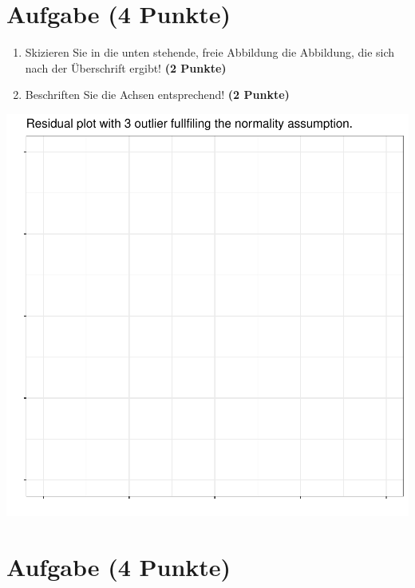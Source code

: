 \documentclass[a4paper, 10pt]{scrartcl}\usepackage[]{graphicx}\usepackage[]{xcolor}
\makeatletter
\def\maxwidth{ %
  \ifdim\Gin@nat@width>\linewidth
    \linewidth
  \else
    \Gin@nat@width
  \fi
}
\makeatother
\begin{document}
 
\clearpage

\section{Aufgabe \hfill (4 Punkte)}



\begin{enumerate}
\item Skizieren Sie in die unten stehende, freie Abbildung die
  Abbildung, die sich nach der {\"U}berschrift ergibt! \textbf{(2 Punkte)}
\item Beschriften Sie die Achsen entsprechend! \textbf{(2 Punkte)}
\end{enumerate}



{\centering \includegraphics[width=\maxwidth]{img/regression-03-1} 

}



 
\clearpage

\section{Aufgabe \hfill (4 Punkte)}
\end{document}
